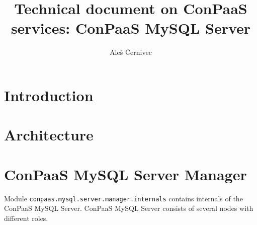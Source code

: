 \documentclass[a4paper,10pt]{article}
\begin{document}
\title{Technical document on ConPaaS services: ConPaaS MySQL Server}
\vspace{15pt}
\author{Ale{\v s} {\v C}ernivec}
\vspace{50pt}
\maketitle
\vspace{15pt}
\setlength{\parindent}{15pt}
\newpage
\tableofcontents
\newpage
\newcommand{\Cmd}[1]{\noindent {\tt #1 }\newline\vspace{2pt}\\}
\newcommand{\Des}[1]{\vspace{4pt}\noindent {\bf Description: }\\{#1}\vspace{2pt}\\ }
\newcommand{\Par}[1]{\vspace{4pt}\noindent {\bf Parameters: } \\{#1}\vspace{2pt}\\}
\newcommand{\Ret}[1]{\vspace{4pt}\noindent {\bf Returns: }\\{#1}\vspace{2pt}\\}
\newcommand{\Rai}[1]{\vspace{4pt}\noindent {\bf Raises: }\\{#1}\vspace{2pt}\\}
\newcommand{\conapi}[5]{\Cmd{#1} \Des{#2} \Par{#3} \Ret{#4} \Rai{#5}\\}

\section{Introduction}

\section{Architecture}

\section{ConPaaS MySQL Server Manager}

Module {\tt conpaas.mysql.server.manager.internals} contains internals of the ConPaaS MySQL Server. ConPaaS MySQL Server consists of several nodes with different roles.
\end{document}
